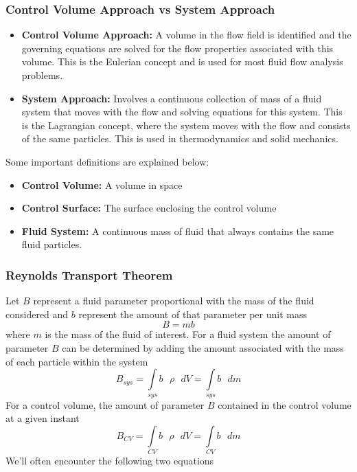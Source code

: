 \documentclass[11pt]{article}
\begin{document}
\subsubsection{Control Volume Approach vs System Approach}
\begin{itemize}
\item \textbf{Control Volume Approach:} A volume in the flow field is identified and the governing equations are solved for the flow properties associated with this volume. This is the Eulerian concept and is used for most fluid flow analysis problems.
\item \textbf{System Approach:} Involves a continuous collection of mass of a fluid system that moves with the flow and solving equations for this system. This is the Lagrangian concept, where the system moves with the flow and consists of the same particles. This is used in thermodynamics and solid mechanics.
\end{itemize}
Some important definitions are explained below:
\begin{itemize}
\item \textbf{Control Volume:} A volume in space
\item \textbf{Control Surface:} The surface enclosing the control volume
\item \textbf{Fluid System:} A continuous mass of fluid that always contains the same fluid particles.
\end{itemize}

\subsubsection{Reynolds Transport Theorem}
Let $B$ represent a fluid parameter proportional with the mass of the fluid considered and $b$ represent the amount of that parameter per unit mass
$$ B = mb$$ where $m$ is the mass of the fluid of interest. For a fluid system the amount of parameter $B$ can be determined by adding the amount associated with the mass of each particle within the system
$$ B_{sys} = \int \limits_{sys} b\text{ } \rho \text{ } dV =  \int \limits_{sys} b\text{ } dm$$
For a control volume, the amount of parameter $B$ contained in the control volume at a given instant 
$$ B_{CV} = \int \limits_{CV} b\text{ } \rho \text{ } dV =  \int \limits_{CV} b\text{ } dm$$
We'll often encounter the following two equations 
\end{document}
